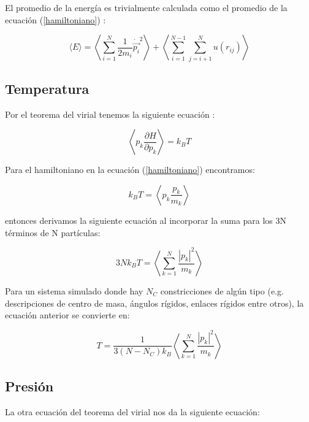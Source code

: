El promedio de la energía es trivialmente calculada como el promedio de la ecuación (\ref{hamiltoniano}) \cite{Allen2017}:

\begin{equation} \label{promenergia}
    \langle E \rangle = \left \langle\sum_{i=1}^{N} \frac{1}{2 m_i}\dot{\vec{p_i}}^2 \right \rangle+ \left \langle\sum_{i=1}^{N-1}\sum_{j=i+1}^{N} u(r_{ij})\right \rangle
\end{equation}

\subsection{Temperatura}

Por el teorema del virial tenemos la siguiente ecuación \cite{Allen2017}:

\begin{equation} \label{virialtheorem}
    \left \langle p_k \frac{\partial H}{\partial p_k} \right \rangle = k_B T
\end{equation}

Para el hamiltoniano en la ecuación (\ref{hamiltoniano}) encontramos:

\begin{equation} \label{virialtemp}
    k_B T = \left \langle p_k \frac{p_k}{m_k} \right \rangle
\end{equation}

entonces derivamos la siguiente ecuación al incorporar la suma para los 3N términos de N partículas:

\begin{equation} \label{virialsumtemp}
    3Nk_B T = \left \langle \sum_{k=1}^{N}\frac{|p_k|^2}{m_k} \right \rangle
\end{equation}

Para un sistema simulado donde hay $N_C$ constricciones de algún tipo (e.g. descripciones de centro de masa, ángulos rígidos, enlaces rígidos entre otros), la ecuación anterior se convierte en:

\begin{equation} \label{virialsumconsttemp}
    T= \frac{1}{3(N - N_C)k_B}\left \langle \sum_{k=1}^{N}\frac{|p_k|^2}{m_k} \right \rangle
\end{equation}

\subsection{Presión}

La otra ecuación del teorema del virial nos da la siguiente ecuación:

